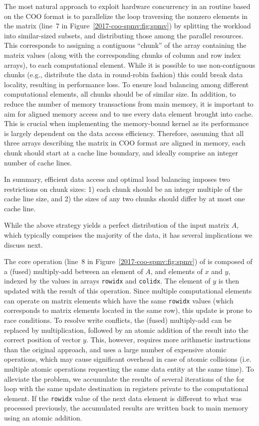 The most natural approach to exploit hardware concurrency in an \spmv routine based
on the COO format is to
parallelize the loop traversing the nonzero elements in the matrix
(line~7 in Figure~\ref{2017-coo-spmv:fig:spmv}) by splitting the workload into similar-sized subsets,
and distributing those among the parallel resources.
This corresponds to assigning a contiguous ``chunk'' of the
array containing the matrix values 
(along with the corresponding chunks of column and row index arrays), 
to each computational element.
While it is possible to use non-contiguous chunks (e.g., distribute the data in
round-robin fashion) this could break data locality, resulting in performance loss.
To ensure load balancing among different computational elements, all chunks
should be of similar size.
In addition, to reduce the number of memory transactions from main memory, it
is important to aim for aligned memory access and to use every data element
brought into cache.
This is crucial when implementing the memory-bound \spmv kernel as its 
performance is largely dependent
on the data access efficiency.
Therefore, assuming that all three arrays describing the matrix in COO format are aligned in memory, each chunk should start at a cache line boundary,
and ideally comprise an integer number of cache lines.

In summary, 
efficient data access and optimal load balancing imposes two restrictions on 
chunk sizes: 
1) each chunk should be an integer multiple of the cache line
size, and 
2) the sizes of any two chunks should differ by at most one cache line.

While the above strategy yields a perfect distribution of the input matrix $A$,
which typically comprises the majority of the data, it has several implications we discuss next.

The core operation (line~8 in Figure~\ref{2017-coo-spmv:fig:spmv}) of \coo \spmv is composed of
a (fused) multiply-add between an element of $A$, and elements of $x$ and $y$,
indexed by the values in arrays \texttt{rowidx} and \texttt{colidx}.
The element of $y$ is then updated with the result of this operation.
Since multiple computational elements can operate on matrix elements which have
the same \texttt{rowidx} values 
(which corresponds to matrix elements located in the same row),
this update is prone to race conditions.
To resolve write conflicts, the (fused) multiply-add can be replaced by multiplication,
followed by an atomic addition of the result into the correct position of
vector $y$.
This, however, requires more arithmetic instructions than the original approach,
and uses a large number of expensive atomic operations, which may
cause significant overhead in case of atomic collisions (i.e. multiple atomic
operations requesting the same data entity at the same time).
To alleviate the problem, we accumulate the results of several iterations of the for loop
with the same update destination in registers private to the computational element.
If the \texttt{rowidx} value of the next data element is different to what was processed previously, 
the accumulated results are written back to main memory using an atomic addition.

